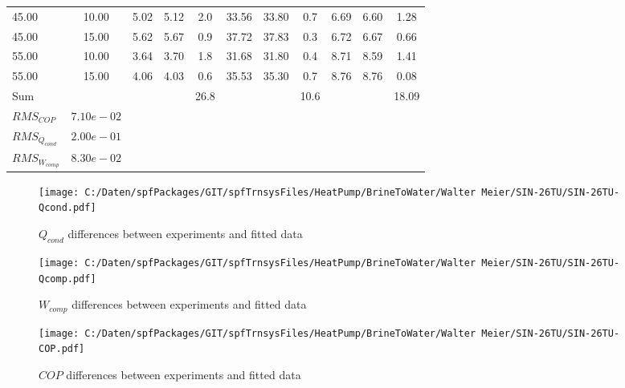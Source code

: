 \documentclass[english]{SPFShortReport}
\begin{document}
\begin{table}[!ht]
\begin{small}
\begin{center}
{\begin{tabular}{l | c c c c c c c c c c }
45.00  & 10.00 & 5.02 & 5.12 & 2.0 & 33.56 & 33.80 & 0.7 & 6.69 & 6.60 & 1.28\\ 
45.00  & 15.00 & 5.62 & 5.67 & 0.9 & 37.72 & 37.83 & 0.3 & 6.72 & 6.67 & 0.66\\ 
55.00  & 10.00 & 3.64 & 3.70 & 1.8 & 31.68 & 31.80 & 0.4 & 8.71 & 8.59 & 1.41\\ 
55.00  & 15.00 & 4.06 & 4.03 & 0.6 & 35.53 & 35.30 & 0.7 & 8.76 & 8.76 & 0.08\\ 
\hline 
 Sum &  & &  & 26.8 &  &  & 10.6 & &  & 18.09\\ 
\hline 
 $RMS_{COP}$ & $7.10e-02$ \\ 
 $RMS_{Q_{cond}}$ & $2.00e-01$ \\ 
 $RMS_{W_{comp}}$ & $8.30e-02$ \\ 
\hline
\hline
\end{tabular}
}
\label{ErrorsTable}
\end{center}
\end{small}
\end{table}
\begin{figure}[!ht]
\begin{center}
\texttt{[image: C:/Daten/spfPackages/GIT/spfTrnsysFiles/HeatPump/BrineToWater/Walter Meier/SIN-26TU/SIN-26TU-Qcond.pdf]}
\caption{$Q_{cond}$ differences between experiments and fitted data}
\label{QcongFig}
\end{center}
\end{figure}
\begin{figure}[!ht]
\begin{center}
\texttt{[image: C:/Daten/spfPackages/GIT/spfTrnsysFiles/HeatPump/BrineToWater/Walter Meier/SIN-26TU/SIN-26TU-Qcomp.pdf]}
\caption{$W_{comp}$ differences between experiments and fitted data}
\label{QcompFig}
\end{center}
\end{figure}
\begin{figure}[!ht]
\begin{center}
\texttt{[image: C:/Daten/spfPackages/GIT/spfTrnsysFiles/HeatPump/BrineToWater/Walter Meier/SIN-26TU/SIN-26TU-COP.pdf]}
\caption{$COP$ differences between experiments and fitted data}
\label{COPFig}
\end{center}
\end{figure}
\end{document}

